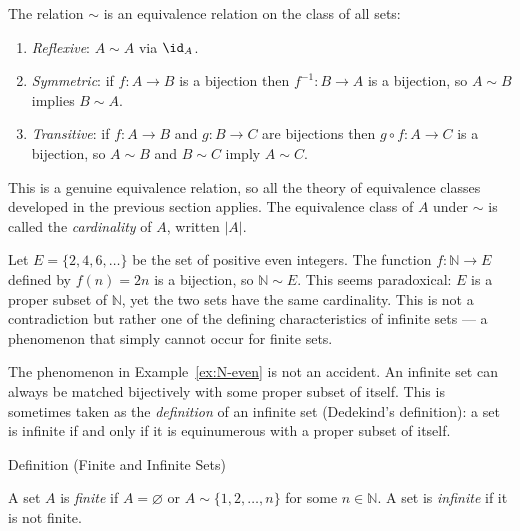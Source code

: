 \begin{remark*}
The relation $\sim$ is an equivalence relation on the class of all sets:
\begin{enumerate}[label=(\roman*)]
\item \emph{Reflexive}: $A \sim A$ via $\id_A$.
\item \emph{Symmetric}: if $f : A \to B$ is a bijection then $f^{-1} : B \to A$
is a bijection, so $A \sim B$ implies $B \sim A$.
\item \emph{Transitive}: if $f : A \to B$ and $g : B \to C$ are bijections then
$g \circ f : A \to C$ is a bijection, so $A \sim B$ and $B \sim C$ imply $A \sim C$.
\end{enumerate}
This is a genuine equivalence relation, so all the theory of equivalence classes
developed in the previous section applies. The equivalence class of $A$ under
$\sim$ is called the \emph{cardinality} of $A$, written $|A|$.
\end{remark*}

\begin{example*}
\label{ex:N-even}
Let $E = \{2, 4, 6, \dots\}$ be the set of positive even integers. The
function $f : \mathbb{N} \to E$ defined by $f(n) = 2n$ is a bijection, so
$\mathbb{N} \sim E$. This seems paradoxical: $E$ is a proper subset of
$\mathbb{N}$, yet the two sets have the same cardinality. This is not a
contradiction but rather one of the defining characteristics of infinite sets
— a phenomenon that simply cannot occur for finite sets.
\end{example*}

\begin{remark*}
The phenomenon in Example~\ref{ex:N-even} is not an accident. An infinite set
can always be matched bijectively with some proper subset of itself. This is
sometimes taken as the \emph{definition} of an infinite set (Dedekind's
definition): a set is infinite if and only if it is equinumerous with a proper
subset of itself.
\end{remark*}


\begin{definitionbox}{Definition (Finite and Infinite Sets)}
\begin{definition}\label{def:finite-infinite}
A set $A$ is \emph{finite} if $A = \varnothing$ or $A \sim \{1, 2, \dots, n\}$
for some $n \in \mathbb{N}$. A set is \emph{infinite} if it is not finite.
\end{definition}
\end{definitionbox}

